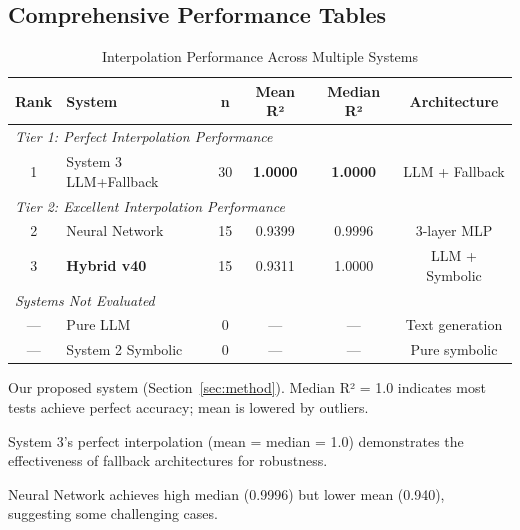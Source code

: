 \subsection{Comprehensive Performance Tables}
\label{sec:comprehensive_tables}


\begin{table}[htbp]
\centering
\caption{Interpolation Performance Across Multiple Systems}
\label{tab:interpolation_performance}
\begin{threeparttable}
\small
\begin{tabular}{@{}clcccc@{}}
\toprule
\textbf{Rank} & \textbf{System} & \textbf{n} & \textbf{Mean R²} & \textbf{Median R²} & \textbf{Architecture} \\
\midrule
\multicolumn{6}{l}{\textit{Tier 1: Perfect Interpolation Performance}} \\
1 & System 3 LLM+Fallback & 30 & \textbf{1.0000} & \textbf{1.0000} & LLM + Fallback \\
\midrule
\multicolumn{6}{l}{\textit{Tier 2: Excellent Interpolation Performance}} \\
2 & Neural Network & 15 & 0.9399 & 0.9996 & 3-layer MLP \\
3 & \textbf{Hybrid v40}\tnote{a} & 15 & 0.9311 & 1.0000 & LLM + Symbolic \\
\midrule
\multicolumn{6}{l}{\textit{Systems Not Evaluated}} \\
--- & Pure LLM & 0 & --- & --- & Text generation \\
--- & System 2 Symbolic & 0 & --- & --- & Pure symbolic \\
\bottomrule
\end{tabular}
\begin{tablenotes}
\item[a] Our proposed system (Section~\ref{sec:method}). Median R² = 1.0 indicates most tests achieve perfect accuracy; mean is lowered by outliers.
\item System 3's perfect interpolation (mean = median = 1.0) demonstrates the effectiveness of fallback architectures for robustness.
\item Neural Network achieves high median (0.9996) but lower mean (0.940), suggesting some challenging cases.
\end{tablenotes}
\end{threeparttable}
\end{table}

